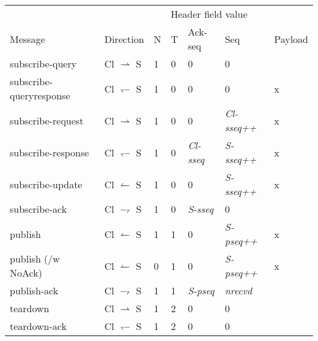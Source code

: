 \begin{tabular}{|l|l|l|l|l|l|l|}
\hline
						& 							& \multicolumn{4}{c|}{Header field value} &	\\
Message					& Direction 				& N	& T	& Ack-seq				& Seq	&	Payload \\
\hline
subscribe-query			& Cl $\rightharpoonup$ S	& 1	& 0 	& 0						& 0	&	\\
\hline
subscribe-queryresponse	& Cl $\leftharpoondown$ S	& 1	& 0		& 0						& 0	&	x \\
\hline
subscribe-request		& Cl $\rightharpoonup$ S	& 1	& 0		& 0						& \emph{Cl-sseq++} & x \\
\hline
subscribe-response		& Cl $\leftharpoondown$ S	& 1	& 0		& \emph{Cl-sseq}		& \emph{S-sseq++} &	 x \\
\hline
subscribe-update		& Cl $\leftharpoonup$ S		& 1	& 0		& 0						& \emph{S-sseq++} &	x \\
\hline
subscribe-ack			& Cl $\rightharpoondown$ S	& 1	& 0		& \emph{S-sseq}	& 0	&	\\
\hline
publish					& Cl $\leftharpoonup$ S		& 1	& 1		& 0						& \emph{S-pseq++} & x \\
\hline
publish	(/w NoAck)      & Cl $\leftharpoonup$ S	& 0	& 1		& 0						& \emph{S-pseq++} & x \\
\hline
publish-ack				& Cl $\rightharpoondown$ S	& 1	& 1		& \emph{S-pseq}			& \emph{nrecvd}	&	\\
\hline
teardown		      	& Cl $\rightharpoonup$ S	& 1	& 2		& 0						& 0	& \\
\hline
teardown-ack			& Cl $\leftharpoondown$ S 	& 1 & 2		& 0						& 0 &	\\
			
\hline
\end{tabular}